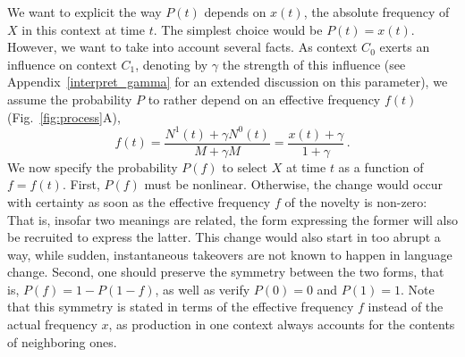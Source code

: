 \documentclass[12pt,twocolumn,amsmath,amssymb,aps,longbibliography]{revtex4-1}  %
\newcommand{\beq}{\begin{equation}}
\newcommand{\eneq}{\end{equation}}
\begin{document}
We want to explicit the way $P(t)$ depends on $x(t)$, the absolute frequency of $X$ in this context at time $t$. The simplest choice would be $P(t)=x(t)$. However, we want to take into account several facts. As context $C_0$ exerts an influence on context $C_1$, denoting by $\gamma$ the strength of this influence (see Appendix~\ref{interpret_gamma} for an extended discussion on this parameter), we assume the probability $P$ to rather depend on an effective frequency $f(t)$ (Fig.~\ref{fig:process}A), 
{\small\beq 
f(t) = \frac{N^1(t) + \gamma N^0(t)}{M + \gamma M} = \frac{x(t)+\gamma }{1+\gamma} \,. \eneq}
We now specify the probability $P(f)$ to select $X$ at time $t$ as a function of $f=f(t)$. First, $P(f)$ must be nonlinear. Otherwise, the change would occur with certainty as soon as the effective frequency $f$ of the novelty is non-zero: That is, insofar two meanings are related, the form expressing the former will also be recruited to express the latter. This change would also start in too abrupt a way, while sudden, instantaneous takeovers are not known to happen in language change. Second, one should preserve the symmetry between the two forms, that is, $P(f) = 1 - P(1-f)$, as well as verify $P(0)=0$ and $P(1)=1$. Note that this symmetry is stated in terms of the effective frequency $f$ instead of the actual frequency $x$, as production in one context always accounts for the contents of neighboring ones. 

\begin{figure*}[!tbp]
\caption{\small Schematic representation of model mechanisms. (A) Difference between absolute frequency $x$ and relative frequency $f$ in context $C_1$. Absolute frequency $x$ is given by the ratio of $X$ occurrences encoded in $C_1$. Effective frequency $f$ also takes into account the $M$ occurrences contained in the influential context $C_0$, with a weight $\gamma$ standing for the strength of this influence. (B) Schematic view of the process. At each iteration, either $X$ or $Y$ is chosen to be produced and thus encoded in memory, with respective probability $P_{\gamma}(x)$ and $1-P_{\gamma}(x)$; the produced occurrence is here represented in the purple capsule. Another occurrence, already encoded in the memory, is uniformly chosen to be erased (red circle) so as to keep the population size constant. Hence the number of $X$ occurrences, $N_X$, either increases by $1$ if $X$ is produced and $Y$ erased, decreases by $1$ if $Y$ is produced and $X$ erased, or remains constant if the erased occurrence is the same as the one produced.}
\label{fig:process}
\end{figure*}
\end{document}

